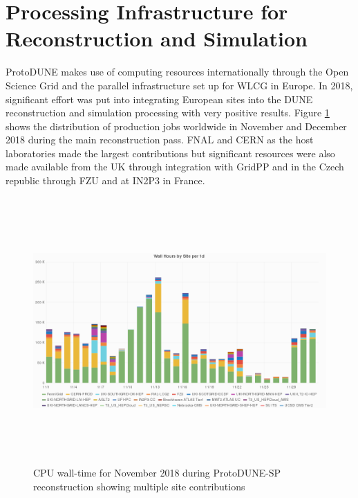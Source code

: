  




\section{Processing Infrastructure for Reconstruction and Simulation}
\label{ch-comp-processing}
ProtoDUNE makes use of computing resources internationally through the Open Science Grid and the parallel infrastructure set up for WLCG in Europe.  In 2018, significant effort was put into integrating European sites into the DUNE reconstruction and simulation processing with very positive results.  
Figure \ref{fig:ch-exec-comp-cpupie} shows the distribution of production jobs worldwide in November and December 2018 during the main reconstruction pass.  FNAL and CERN as the host laboratories made the largest contributions but significant resources were also made available from the UK through integration with GridPP and in the Czech republic through FZU and at IN2P3 in France. 

\begin{figure}[htp]
\centering
\includegraphics[height=4in]{graphics/comp-vo-summary.png}
\caption{CPU wall-time for November 2018 during ProtoDUNE-SP reconstruction showing multiple site contributions}
\label{fig:ch-exec-comp-cpupie}
\end{figure}

